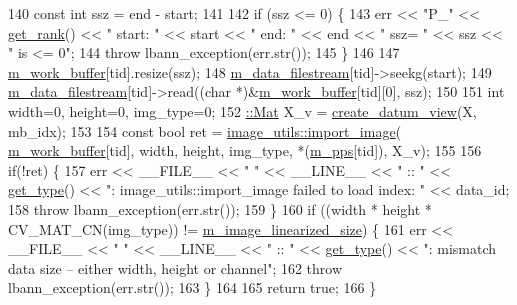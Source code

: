 \begin{DoxyCode}
140   \textcolor{keyword}{const} \textcolor{keywordtype}{int} ssz = end - start;
141 
142   \textcolor{keywordflow}{if} (ssz <= 0) \{
143     err << \textcolor{stringliteral}{"P\_"} << \hyperlink{classlbann_1_1generic__data__reader_ab5321bd7c6e83845785753366e6d9e64}{get\_rank}() << \textcolor{stringliteral}{" start: "} << start << \textcolor{stringliteral}{" end: "} << end << \textcolor{stringliteral}{" ssz= "} << ssz << \textcolor{stringliteral}{" is
       <= 0"};
144     \textcolor{keywordflow}{throw} lbann\_exception(err.str());
145   \}
146 
147   \hyperlink{classlbann_1_1imagenet__reader__single_a499b197f1d985b592801de9adfe2d2f5}{m\_work\_buffer}[tid].resize(ssz);
148   \hyperlink{classlbann_1_1imagenet__reader__single_af617e1b0b019049682db6de6e01b05ca}{m\_data\_filestream}[tid]->seekg(start);
149   \hyperlink{classlbann_1_1imagenet__reader__single_af617e1b0b019049682db6de6e01b05ca}{m\_data\_filestream}[tid]->read((\textcolor{keywordtype}{char} *)&\hyperlink{classlbann_1_1imagenet__reader__single_a499b197f1d985b592801de9adfe2d2f5}{m\_work\_buffer}[tid][0], ssz);
150 
151   \textcolor{keywordtype}{int} width=0, height=0, img\_type=0;
152   \hyperlink{base_8hpp_a68f11fdc31b62516cb310831bbe54d73}{::Mat} X\_v = \hyperlink{classlbann_1_1imagenet__reader_a5c0662ebaa378f7f5b4448f4d207e872}{create\_datum\_view}(X, mb\_idx);
153 
154   \textcolor{keyword}{const} \textcolor{keywordtype}{bool} ret = \hyperlink{classlbann_1_1image__utils_a720f0987ec8eff333bf697ed18aafc93}{image\_utils::import\_image}(
      \hyperlink{classlbann_1_1imagenet__reader__single_a499b197f1d985b592801de9adfe2d2f5}{m\_work\_buffer}[tid], width, height, img\_type, *(\hyperlink{classlbann_1_1imagenet__reader_a1e0d0ed4ac529de3e9f735512f5e3dd8}{m\_pps}[tid]), X\_v);
155 
156   \textcolor{keywordflow}{if}(!ret) \{
157     err << \_\_FILE\_\_ << \textcolor{stringliteral}{" "} << \_\_LINE\_\_ << \textcolor{stringliteral}{" :: "} << \hyperlink{classlbann_1_1imagenet__reader__single_aecd9cec6777e4a7485daa5b0396afee0}{get\_type}() << \textcolor{stringliteral}{": image\_utils::import\_image
       failed to load index: "} << data\_id;
158     \textcolor{keywordflow}{throw} lbann\_exception(err.str());
159   \}
160   \textcolor{keywordflow}{if} ((width * height * CV\_MAT\_CN(img\_type)) != \hyperlink{classlbann_1_1image__data__reader_af512f1f866c0f654309b7f28886dca9a}{m\_image\_linearized\_size}) \{
161     err << \_\_FILE\_\_ << \textcolor{stringliteral}{" "} << \_\_LINE\_\_ << \textcolor{stringliteral}{" :: "} << \hyperlink{classlbann_1_1imagenet__reader__single_aecd9cec6777e4a7485daa5b0396afee0}{get\_type}() << \textcolor{stringliteral}{": mismatch data size -- either
       width, height or channel"};
162     \textcolor{keywordflow}{throw} lbann\_exception(err.str());
163   \}
164 
165   \textcolor{keywordflow}{return} \textcolor{keyword}{true};
166 \}
\end{DoxyCode}
